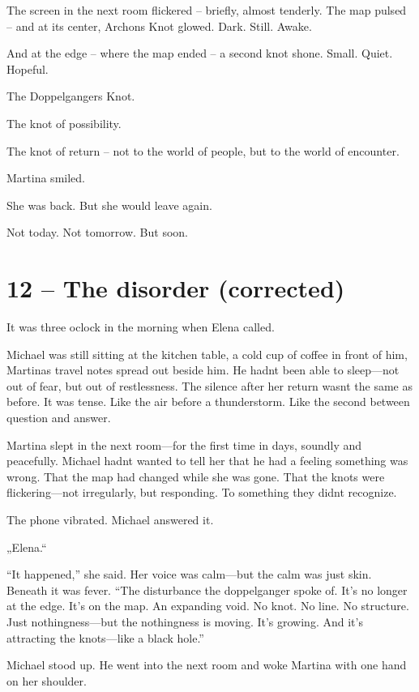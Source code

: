 \documentclass[
]{article}
\begin{document}
The screen in the next room flickered -- briefly, almost tenderly. The map pulsed -- and at its center, Archon\textquotesingle s Knot glowed. Dark. Still. Awake.

And at the edge -- where the map ended -- a second knot shone. Small. Quiet. Hopeful.

The Doppelganger\textquotesingle s Knot.

The knot of possibility.

The knot of return -- not to the world of people, but to the world of encounter.

Martina smiled.

She was back. But she would leave again.

Not today. Not tomorrow. But soon.

\section{12 -- The disorder (corrected)}\label{the-disorder-corrected}

It was three o\textquotesingle clock in the morning when Elena called.

Michael was still sitting at the kitchen table, a cold cup of coffee in front of him, Martina\textquotesingle s travel notes spread out beside him. He hadn\textquotesingle t been able to sleep---not out of fear, but out of restlessness. The silence after her return wasn\textquotesingle t the same as before. It was tense. Like the air before a thunderstorm. Like the second between question and answer.

Martina slept in the next room---for the first time in days, soundly and peacefully. Michael hadn\textquotesingle t wanted to tell her that he had a feeling something was wrong. That the map had changed while she was gone. That the knots were flickering---not irregularly, but responding. To something they didn\textquotesingle t recognize.

The phone vibrated. Michael answered it.

„Elena.``

``It happened,'' she said. Her voice was calm---but the calm was just skin. Beneath it was fever. ``The disturbance the doppelganger spoke of. It's no longer at the edge. It's on the map. An expanding void. No knot. No line. No structure. Just nothingness---but the nothingness is moving. It's growing. And it's attracting the knots---like a black hole.''

Michael stood up. He went into the next room and woke Martina with one hand on her shoulder.
\end{document}
